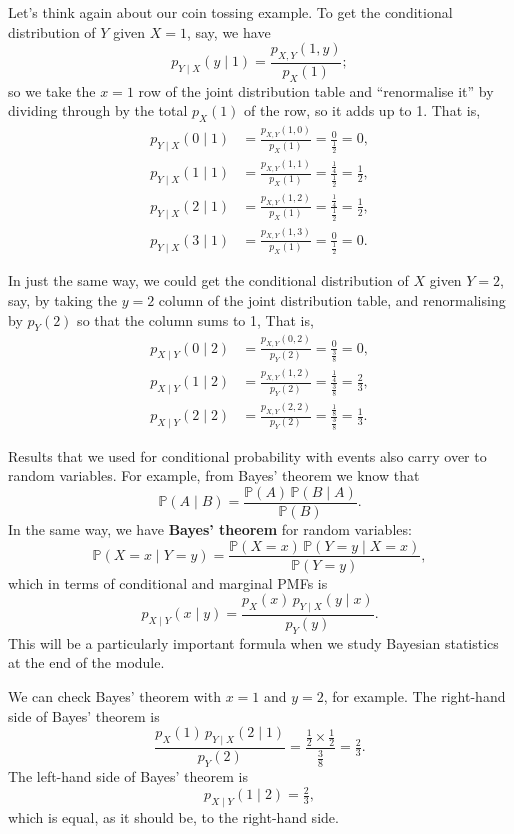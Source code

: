 \documentclass[
  a4paper,
]{book}
\theoremstyle{definition}
\theoremstyle{definition}
\theoremstyle{definition}
\theoremstyle{definition}
\theoremstyle{remark}
\begin{document}
Let's think again about our coin tossing example. To get the conditional distribution of \(Y\) given \(X = 1\), say, we have
\[ p_{Y \mid X}(y \mid 1) = \frac{p_{X,Y}(1,y)}{p_X(1)} ;   \]
so we take the \(x = 1\) row of the joint distribution table and ``renormalise it'' by dividing through by the total \(p_X(1)\) of the row, so it adds up to 1. That is,
\begin{align*}
  p_{Y \mid X} (0 \mid 1) &= \frac{p_{X,Y}(1, 0)}{p_X(1)} = \frac{0}{\frac12} = 0 , \\
  p_{Y \mid X} (1 \mid 1) &= \frac{p_{X,Y}(1, 1)}{p_X(1)} = \frac{\frac14}{\frac12} = \tfrac12 , \\
  p_{Y \mid X} (2 \mid 1) &= \frac{p_{X,Y}(1, 2)}{p_X(1)} = \frac{\frac14}{\frac12} = \tfrac12 , \\
  p_{Y \mid X} (3 \mid 1) &= \frac{p_{X,Y}(1, 3)}{p_X(1)} = \frac{0}{\frac12} = 0 .
\end{align*}

In just the same way, we could get the conditional distribution of \(X\) given \(Y = 2\), say, by taking the \(y = 2\) column of the joint distribution table, and renormalising by \(p_Y(2)\) so that the column sums to 1, That is,
\begin{align*}
  p_{X \mid Y} (0 \mid 2) &= \frac{p_{X,Y}(0,2)}{p_Y(2)} = \frac{0}{\frac38} = 0 , \\
  p_{X \mid Y} (1 \mid 2) &= \frac{p_{X,Y}(1,2)}{p_Y(2)} = \frac{\frac14}{\frac38} = \tfrac23 , \\
  p_{X \mid Y} (2 \mid 2) &= \frac{p_{X,Y}(2,2)}{p_Y(2)} = \frac{\frac18}{\frac38} = \tfrac13 .
\end{align*}

Results that we used for conditional probability with events also carry over to random variables. For example, from Bayes' theorem we know that
\[ \mathbb P(A \mid B) = \frac{ \mathbb P(A) \, \mathbb P(B \mid A)}{\mathbb P(B)} . \]
In the same way, we have \textbf{Bayes' theorem} for random variables:
\[ \mathbb P(X = x \mid Y = y) = \frac{ \mathbb P(X = x) \, \mathbb P(Y = y \mid X = x)}{\mathbb P(Y = y)} , \]
which in terms of conditional and marginal PMFs is
\[ p_{X \mid Y}(x \mid y) = \frac{p_X(x) \, p_{Y \mid X}(y \mid x)}{p_Y(y)} . \]
This will be a particularly important formula when we study Bayesian statistics at the end of the module.

We can check Bayes' theorem with \(x = 1\) and \(y = 2\), for example.
The right-hand side of Bayes' theorem is
\[ \frac{p_X(1) \, p_{Y \mid X}(2 \mid 1)}{p_Y(2)} = \frac{\frac12 \times \frac12}{\frac38} = \tfrac{2}{3} .   \]
The left-hand side of Bayes' theorem is
\[ p_{X \mid Y}(1 \mid 2) = \tfrac23 , \]
which is equal, as it should be, to the right-hand side.
\end{document}
